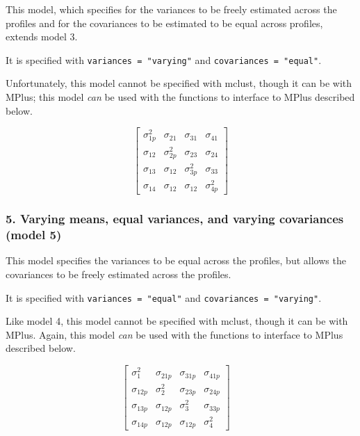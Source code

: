 \documentclass[man]{apa6}
\begin{document}
This model, which specifies for the variances to be freely estimated across the profiles and for the covariances to be estimated to be equal across profiles, extends model 3.

It is specified with \texttt{variances\ =\ "varying"} and \texttt{covariances\ =\ "equal"}.

Unfortunately, this model cannot be specified with mclust, though it can be with MPlus; this model \emph{can} be used with the functions to interface to MPlus described below.

\[
\left[ \begin{matrix} { \sigma  }_{ 1p }^{ 2 } & { \sigma  }_{ 21 } & { \sigma  }_{ 31 } & { \sigma  }_{ 41 } \\ { \sigma  }_{ 12 } & { \sigma  }_{ 2p }^{ 2 } & { \sigma  }_{ 23 } & { \sigma  }_{ 24 } \\ { \sigma  }_{ 13 } & { \sigma  }_{ 12 } & { \sigma  }_{ 3p }^{ 2 } & { \sigma  }_{ 33 } \\ { \sigma  }_{ 14 } & { \sigma  }_{ 12 } & { \sigma  }_{ 12 } & { \sigma  }_{ 4p }^{ 2 } \end{matrix} \right] 
\]

\hypertarget{varying-means-equal-variances-and-varying-covariances-model-5}{%
\subsubsection{5. Varying means, equal variances, and varying covariances (model 5)}\label{varying-means-equal-variances-and-varying-covariances-model-5}}

This model specifies the variances to be equal across the profiles, but allows the covariances to be freely estimated across the profiles.

It is specified with \texttt{variances\ =\ "equal"} and \texttt{covariances\ =\ "varying"}.

Like model 4, this model cannot be specified with mclust, though it can be with MPlus. Again, this model \emph{can} be used with the functions to interface to MPlus described below.

\[
\left[ \begin{matrix} { \sigma  }_{ 1 }^{ 2 } & { \sigma  }_{ 21p } & { \sigma  }_{ 31p } & { \sigma  }_{ 41p } \\ { \sigma  }_{ 12p } & { \sigma  }_{ 2 }^{ 2 } & { \sigma  }_{ 23p } & { \sigma  }_{ 24p } \\ { \sigma  }_{ 13p } & { \sigma  }_{ 12p } & { \sigma  }_{ 3 }^{ 2 } & { \sigma  }_{ 33p } \\ { \sigma  }_{ 14p } & { \sigma  }_{ 12p } & { \sigma  }_{ 12p } & { \sigma  }_{ 4 }^{ 2 } \end{matrix} \right] \quad 
\]
\end{document}
